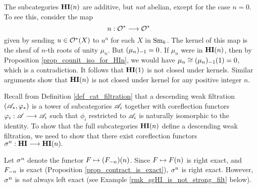 \begin{rmk}
The subcategories $\LHI[n]{\HI}$ are additive, but \emph{not} 
abelian, except for the case $n = 0$. To see this, consider the 
map
\[
n: \Ox \to \Ox
\]
given by sending $u \in \Ox(X)$ to $u^n$ for each $X$ in $\Sm$.  The
kernel of this map is the sheaf of $n$-th roots of unity $\mu_n$.  But
$\RHI{(\mu_n)} = 0$. If $\mu_n$ were in $\LHI[n]{\HI}$, then by
Proposition \ref{prop_counit_iso_for_HIn}, we would have $\mu_n \cong
\LHI[1]{\RHI[1]{(\mu_n)}} = 0$, which is a contradiction. It follows
that $\LHI{\HI}$ is not closed under kernels. Similar arguments show
that $\LHI[n]{\HI}$ is not closed under kernel for any positive
integer $n$.
\end{rmk}

Recall from Definition \ref{def_cat_filtration} that a descending weak
filtration $(\Cat{A}_*, \phi_*)$ is a tower of subcategories
$\Cat{A}_i$ together with coreflection functors $\phi_i:
\Cat{A} \to \Cat{A}_i$ such that $\phi_i$ restricted to $\Cat{A}_i$ is
naturally isomorphic to the identity.  To show that the full
subcategories $\LHI[n]{\HI}$ define a descending weak filtration, we
need to show that there exist coreflection functors $\sgHI{n}: \HI \to
\LHI[n]{\HI}.$

\begin{defn}
Let $\sgHI{n}$ denote the functor $F \mapsto \LHI[n]{(\RHI[n]{F})}$.
Since $F \mapsto \LHI[n]{F}$ is right exact, and $\RHI[n]{F}$ is
exact (Proposition \ref{prop_contract_is_exact}), $\sgHI{n}$ is right
exact. However, $\sgHI{n}$ is \emph{not} always left exact (see Example
\ref{rmk_sgHI_is_not_strong_filt} below).
\end{defn}

